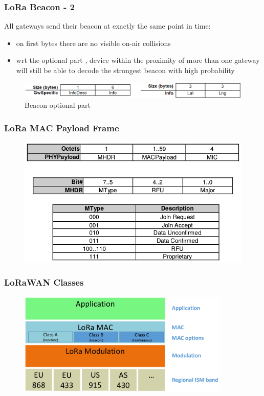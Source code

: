 \begin{frame}[fragile]
	\frametitle{LoRa Beacon - 2}
	All gateways send their beacon at exactly the same point in time:
	\begin{itemize}
		\item on first bytes there are no visible on-air collisions 
		\item wrt the optional part , device within the proximity of more than one
		gateway will still be able to decode the strongest beacon with high probability
	\end{itemize}
	\begin{figure}
		\centering
		\includegraphics[width=\textwidth]{img/optional.png}
		\caption{Beacon optional part}
	\end{figure}
\end{frame}

\begin{frame}[fragile]
  \frametitle{LoRa MAC Payload Frame}
  
 \begin{figure}
  \centering
  \includegraphics[width=\textwidth]{img/mac_frame.png}
  \end{figure}

\end{frame}


\begin{frame}[fragile]
  \frametitle{LoRaWAN Classes}
  \begin{figure}
    \centering
    \includegraphics[width=0.9\textwidth]{img/loraClasses.png}
  \end{figure}
\end{frame}


